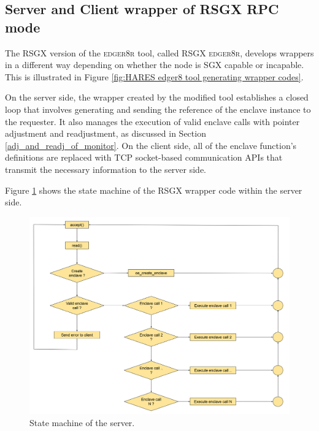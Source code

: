\documentclass[article, doublespace,nopageskip]{VTthesis} %
\newcommand{\monitor}{RSGX \xspace}
\begin{document}
    \subsection{Server and Client wrapper of \monitor RPC mode} \label{Server and client wrapper of RPC mode}
    
    The \monitor version of the \textsc{edger8r} tool, called \monitor \textsc{edger8r}, develops wrappers in a different way depending on whether the node is SGX capable or incapable. This is illustrated in Figure \ref{fig:HARES edger8 tool generating wrapper codes}. 
    
    On the server side, the wrapper created by the modified tool establishes a closed loop that involves generating and sending the reference of the enclave instance to the requester. It also manages the execution of valid enclave calls with pointer adjustment and readjustment, as discussed in Section \ref{adj_and_readj_of_monitor}. On the client side, all of the enclave function's definitions are replaced with TCP socket-based communication APIs that transmit the necessary information to the server side. 
    
    Figure \ref{fig:server_state_machine} shows the state machine of the \monitor wrapper code within the server side.

    \begin{figure}[htb]
        \includegraphics[scale=0.3]{figures/server_state_machine.png}
        \caption{State machine of the server.} 
        \label{fig:server_state_machine}
    \end{figure}
    
\end{document}

